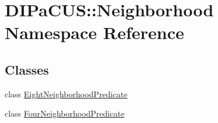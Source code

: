 \hypertarget{namespaceDIPaCUS_1_1Neighborhood}{}\section{D\+I\+Pa\+C\+US\+:\+:Neighborhood Namespace Reference}
\label{namespaceDIPaCUS_1_1Neighborhood}
\subsection*{Classes}
\begin{DoxyCompactItemize}
\item 
class \mbox{\hyperlink{classDIPaCUS_1_1Neighborhood_1_1EightNeighborhoodPredicate}{Eight\+Neighborhood\+Predicate}}
\item 
class \mbox{\hyperlink{classDIPaCUS_1_1Neighborhood_1_1FourNeighborhoodPredicate}{Four\+Neighborhood\+Predicate}}
\end{DoxyCompactItemize}
